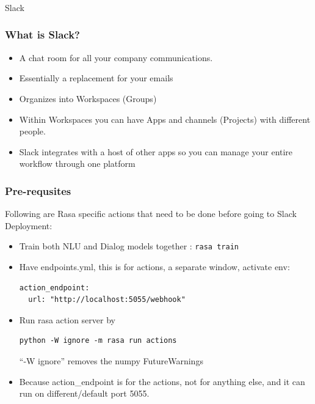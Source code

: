 \begin{frame}[fragile]\frametitle{}
\begin{center}
{\Large Slack}

\end{center}
\end{frame}

\begin{frame}[fragile]\frametitle{What is Slack?}
\begin{itemize}
\item A chat room for all your company communications.
\item Essentially a replacement for your emails
\item Organizes into Workspaces (Groups)
\item Within Workspaces you can have Apps and channels (Projects) with different people.
\item Slack integrates with a host of other apps so you can manage your entire workflow through one platform
\end{itemize}

\end{frame}

\begin{frame}[fragile]\frametitle{Pre-requsites}
Following are Rasa specific actions that need to be done before going to Slack Deployment:
\begin{itemize}
\item Train both NLU and Dialog models together : \lstinline|rasa train|
\item Have endpoints.yml, this is for actions, a separate window, activate env: 
\begin{lstlisting}
action_endpoint:
  url: "http://localhost:5055/webhook"
\end{lstlisting}
\item Run rasa action server by
\begin{lstlisting}
python -W ignore -m rasa run actions
\end{lstlisting}
``-W ignore'' removes the numpy FutureWarnings
\item Because action\_endpoint is for the actions, not for anything else, and it can run on different/default port 5055.
\end{itemize}

\end{frame}

